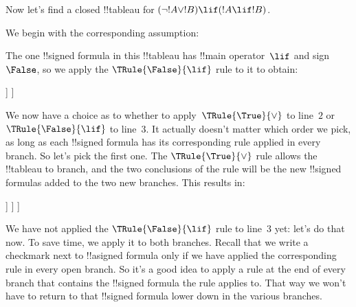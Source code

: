 \documentclass[../../../include/open-logic-section]{subfiles}
\begin{document}
\begin{ex}
Now let's find a closed !!{tableau} for $(\lnot !A \lor !B) \lif (!A
\lif !B)$.

We begin with the corresponding assumption:
\begin{oltableau}
  [\sFmla{\False}{(\lnot \formula{A} \lor \formula{B}) \lif
      (\formula{A} \lif \formula{B})}, just=\TAss]
\end{oltableau}
The one !!{signed formula} in this !!{tableau} has !!{main operator}~$\lif$
and sign~$\False$, so we apply the $\TRule{\False}{\lif}$ rule to it
to obtain:
\begin{oltableau}
  [\sFmla{\False}{(\lnot \formula{A} \lor \formula{B})
      \lif (\formula{A} \lif \formula{B})}, just=\TAss, checked
    [\sFmla{\True}{\lnot \formula{A} \lor \formula{B}},
      just={\TRule{\False}{\lif}[1]}
      [\sFmla{\False}{(\formula{A} \lif \formula{B})},
        just={\TRule{\False}{\lif}[1]}
      ]
    ]
  ]
\end{oltableau}
We now have a choice as to whether to apply~$\TRule{\True}{\lor}$ to
line~$2$ or $\TRule{\False}{\lif}$ to line~$3$. It actually doesn't
matter which order we pick, as long as each !!{signed formula} has its
corresponding rule applied in every branch. So let's pick the first
one. The $\TRule{\True}{\lor}$ rule allows the !!{tableau} to branch,
and the two conclusions of the rule will be the new !!{signed formula}s
added to the two new branches. This results in:
\begin{oltableau}
  [\sFmla{\False}{(\lnot \formula{A} \lor \formula{B}) \lif
      (\formula{A} \lif \formula{B})}, just=\TAss, checked
    [\sFmla{\True}{\lnot \formula{A} \lor \formula{B}},
      just={\TRule{\False}{\lif}[1]}, checked
      [\sFmla{\False}{(\formula{A} \lif \formula{B})},
        just={\TRule{\False}{\lif}[1]}
        [\sFmla{\True}{\lnot \formula{A}}, just={\TRule{\True}{\lor}[2]}]
        [\sFmla{\True}{\formula{B}}, just={\TRule{\True}{\lor}[2]}]
      ]
    ]
  ]
\end{oltableau}
We have not applied the $\TRule{\False}{\lif}$ rule to line~$3$ yet:
let's do that now.  To save time, we apply it to both branches.
Recall that we write a checkmark next to !!a{signed formula} only if
we have applied the corresponding rule in every open branch. So it's a
good idea to apply a rule at the end of every branch that contains the
!!{signed formula} the rule applies to. That way we won't have to
return to that !!{signed formula} lower down in the various branches.
\begin{oltableau}

\end{oltableau}
\end{ex}
\end{document}
